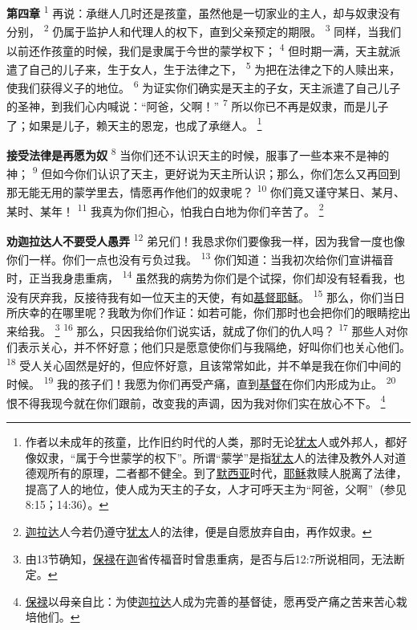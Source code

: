 \textbf{第四章\quad}
\textsuperscript{1}
再说：承继人几时还是孩童，虽然他是一切家业的主人，却与奴隶没有分别，
\textsuperscript{2}
仍属于监护人和代理人的权下，直到父亲预定的期限。
\textsuperscript{3}
同样，当我们以前还作孩童的时候，我们是隶属于今世的蒙学权下；
\textsuperscript{4}
但时期一满，天主就派遣了自己的儿子来，生于女人，生于法律之下，
\textsuperscript{5}
为把在法律之下的人赎出来，使我们获得义子的地位。
\textsuperscript{6}
为证实你们确实是天主的子女，天主派遣了自己儿子的圣神，到我们心内喊说：“阿爸，父啊！”
\textsuperscript{7}
所以你已不再是奴隶，而是儿子了；如果是儿子，赖天主的恩宠，也成了承继人。
\footnote{作者以未成年的孩童，比作旧约时代的人类，那时无论\uline{犹太}人或外邦人，都好像奴隶，“属于今世蒙学的权下”。所谓“蒙学”是指\uline{犹太}人的法律及教外人对道德观所有的原理，二者都不健全。到了\uline{默西亚}时代，\uline{耶稣}救赎人脱离了法律，提高了人的地位，使人成为天主的子女，人才可呼天主为“阿爸，父啊”（参见8:15；14:36）。}

\textbf{接受法律是再愿为奴\quad}
\textsuperscript{8}
当你们还不认识天主的时候，服事了一些本来不是神的神；
\textsuperscript{9}
但如今你们认识了天主，更好说为天主所认识；那么，你们怎么又再回到那无能无用的蒙学里去，情愿再作他们的奴隶呢？
\textsuperscript{10}
你们竟又谨守某日、某月、某时、某年！
\textsuperscript{11}
我真为你们担心，怕我白白地为你们辛苦了。
\footnote{\uline{迦拉达}人今若仍遵守\uline{犹太}人的法律，便是自愿放弃自由，再作奴隶。}

\textbf{劝迦拉达人不要受人愚弄\quad}
\textsuperscript{12}
弟兄们！我恳求你们要像我一样，因为我曾一度也像你们一样。你们一点也没有亏负过我。
\textsuperscript{13}
你们知道：当我初次给你们宣讲福音时，正当我身患重病，
\textsuperscript{14}
虽然我的病势为你们是个试探，你们却没有轻看我，也没有厌弃我，反接待我有如一位天主的天使，有如\uline{基督}\uline{耶稣}。
\textsuperscript{15}
那么，你们当日所庆幸的在哪里呢？我敢为你们作证：如若可能，你们那时也会把你们的眼睛挖出来给我。
\footnote{由13节确知，\uline{保禄}在\uline{迦}省传福音时曾患重病，是否与后12:7所说相同，无法断定。}
\textsuperscript{16}
那么，只因我给你们说实话，就成了你们的仇人吗？
\textsuperscript{17}
那些人对你们表示关心，并不怀好意；他们只是愿意使你们与我隔绝，好叫你们也关心他们。
\textsuperscript{18}
受人关心固然是好的，但应怀好意，且该常常如此，并不单是我在你们中间的时候。
\textsuperscript{19}
我的孩子们！我愿为你们再受产痛，直到\uline{基督}在你们内形成为止。
\textsuperscript{20}
恨不得我现今就在你们跟前，改变我的声调，因为我对你们实在放心不下。
\footnote{\uline{保禄}以母亲自比：为使\uline{迦拉达}人成为完善的基督徒，愿再受产痛之苦来苦心栽培他们。}

